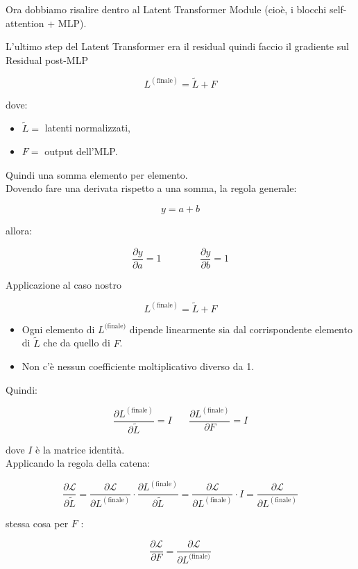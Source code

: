 \documentclass[
  11pt,
]{article}
\begin{document}
Ora dobbiamo risalire dentro al Latent Transformer Module (cioè, i
blocchi self-attention + MLP).

L'ultimo step del Latent Transformer era il residual quindi faccio il
gradiente sul Residual post-MLP

\[L^{(\text{finale})} = \widetilde{L} + F\]

dove:

\begin{itemize}
\item
  \(\widetilde{L} =\) latenti normalizzati,
\item
  \(F =\) output dell'MLP.
\end{itemize}

Quindi una somma elemento per elemento.\\
Dovendo fare una derivata rispetto a una somma, la regola generale:

\[y = a + b\]

allora:

\[\frac{\partial y}{\partial a} = 1\ \ \ \ \ \ \ \ \ \ \ \ \ \ \ \ \ \ \frac{\partial y}{\partial b} = 1\]

Applicazione al caso nostro

\[L^{(\text{finale})} = \widetilde{L} + F\]

\begin{itemize}
\item
  Ogni elemento di \(L^{\text{(finale)}}\) dipende linearmente sia dal
  corrispondente elemento di \(\widetilde{L}\) che da quello di \(F\).
\item
  Non c'è nessun coefficiente moltiplicativo diverso da
  1.
\end{itemize}

Quindi:

\[\frac{\partial L^{(\text{finale})}}{\partial\widetilde{L}} = I\ \ \ \ \ \ \ \ \frac{\partial L^{(\text{finale})}}{\partial F} = I\]

dove \(I\) è la matrice identità.\\
Applicando la regola della catena:

\[\frac{\partial\mathcal{L}}{\partial\widetilde{L}} = \frac{\partial\mathcal{L}}{\partial L^{(\text{finale})}} \cdot \frac{\partial L^{(\text{finale})}}{\partial\widetilde{L}} = \frac{\partial\mathcal{L}}{\partial L^{(\text{finale})}} \cdot I = \frac{\partial\mathcal{L}}{\partial L^{(\text{finale})}}\]

stessa cosa per \(F\) :

\[\frac{\partial\mathcal{L}}{\partial F} = \frac{\partial\mathcal{L}}{\partial L^{\text{(finale)}}}\]
\end{document}

